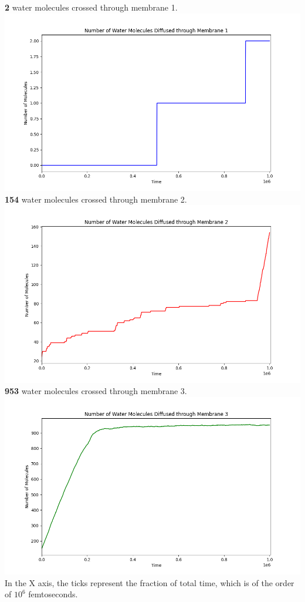 \documentclass[11pt]{article}
\begin{document}
\textbf{2} water molecules crossed through membrane 1. \\
\includegraphics[scale=0.5]{Mem1_1.png} \\
\textbf{154} water molecules crossed through membrane 2. \\
\includegraphics[scale=0.5]{Mem2_1.png} \\ 
\textbf{953} water molecules crossed through membrane 3. \\
\includegraphics[scale=0.5]{Mem3_1.png} \\ 
In the X axis, the ticks represent the fraction of total time, which is of the order of $10^6$ femtoseconds.
\end{document}
